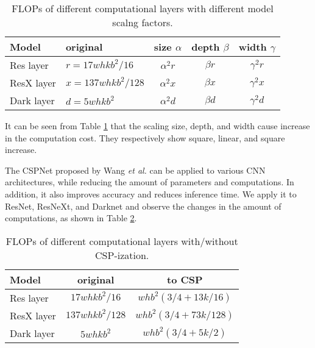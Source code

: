 \documentclass[10pt,twocolumn,letterpaper]{article}
\begin{document}
\begin{table}[h]
	\centering
	\begin{threeparttable}[h]
		\footnotesize
		\caption{FLOPs of different computational layers with different model scalng factors.}
		\label{table:t1}
		\setlength\tabcolsep{3.5pt}
		\begin{tabular}{llccc}
			\toprule
			\textbf{Model} & \textbf{original} & \textbf{size $\alpha$} & \textbf{depth $\beta$} & \textbf{width $\gamma$} \\			
			\midrule
			Res layer & $r = 17whk{b}^{2}/16$ & ${\alpha}^{2}r$ & ${\beta}r$ & ${\gamma}^{2}r$ \\
			ResX layer & $x = 137whk{b}^{2}/128$ & ${\alpha}^{2}x$ & ${\beta}x$ & ${\gamma}^{2}x$ \\
			Dark layer & $d = 5whk{b}^{2}$ & ${\alpha}^{2}d$ & ${\beta}d$ & ${\gamma}^{2}d$ \\
			\bottomrule
		\end{tabular}
	\end{threeparttable}
\end{table}

It can be seen from Table \ref{table:t1} that the scaling size, depth, and width cause increase in the computation cost.  They respectively show square, linear, and square increase.

The CSPNet \cite{wang2020cspnet} proposed by Wang \textit{et al.} can be applied to various CNN architectures, while reducing the amount of parameters and computations. In addition, it also improves accuracy and reduces inference time.  We apply it to ResNet, ResNeXt, and Darknet and observe the changes in the amount of computations, as shown in Table \ref{table:t3}.

\begin{table}[h]
	\centering
	\begin{threeparttable}[h]
		\footnotesize
		\caption{FLOPs of different computational layers with/without CSP-ization.}
		\label{table:t3}
		\setlength\tabcolsep{3.5pt}
		\begin{tabular}{lcc}
			\toprule
			\textbf{Model} & \textbf{original} & \textbf{to CSP} \\				
			\midrule
			Res layer & $17whk{b}^{2}/16$ & $wh{b}^{2}(3/4+13k/16)$ \\
			ResX layer & $137whk{b}^{2}/128$ & $wh{b}^{2}(3/4+73k/128)$ \\
			Dark layer & $5whk{b}^{2}$ & $wh{b}^{2}(3/4+5k/2)$ \\
			\bottomrule
		\end{tabular}
	\end{threeparttable}
\end{table}
\end{document}
